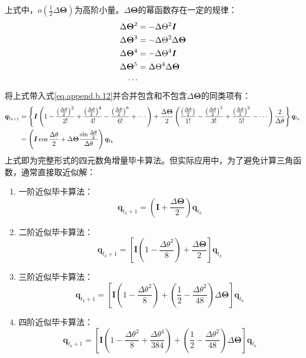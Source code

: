上式中，$o\left(\frac{1}{2}\Delta\bm{\Theta}\right)$为高阶小量。$\Delta\bm{\Theta}$的幂函数存在一定的规律：
\begin{equation}
\centering
\begin{aligned}
\Delta\bm{\Theta}^2&=-\Delta\Theta^2\bm{I}\\
\Delta\bm{\Theta}^3&=-\Delta\Theta^2\Delta\bm{\Theta}\\
\Delta\bm{\Theta}^4&=-\Delta\Theta^4\bm{I}\\
\Delta\bm{\Theta}^5&=\Delta\Theta^4\Delta\bm{\Theta}\\
\cdots
\end{aligned}
\end{equation}
将上式带入式\ref{eq.append.b.12}并合并包含和不包含$\Delta\bm{\Theta}$的同类项有：
\begin{equation}
\centering
\begin{aligned}
\bm{q}_{t_{k+1}}&=\left\{\bm{I}\left(1-\frac{\left(\frac{\Delta\theta}{2}\right)^2}{2!}+\frac{\left(\frac{\Delta\theta}{2}\right)^4}{4!}-\frac{\left(\frac{\Delta\theta}{2}\right)^6}{6!}+\cdots\right)+\frac{\Delta\bm{\Theta}}{2}\left(\frac{\left(\frac{\Delta\theta}{2}\right)}{1!}-\frac{\left(\frac{\Delta\theta}{2}\right)^3}{3!}+\frac{\left(\frac{\Delta\theta}{2}\right)^5}{5!}-\cdots\right)\frac{2}{\Delta\theta}\right\}\bm{q}_{t_k}\\
&=\left(\bm{I}\cos\frac{\Delta\theta}{2}+\Delta\bm{\Theta}\frac{\sin\frac{\Delta\theta}{2}}{\Delta\theta}\right)\bm{q}_{t_k}
\end{aligned}
\end{equation}
上式即为完整形式的四元数角增量毕卡算法。但实际应用中，为了避免计算三角函数，通常直接取近似解：
\begin{enumerate}
	\item 一阶近似毕卡算法：
	\begin{equation}
		\bm{q}_{t_k+1}=\left(\bm{I}+\frac{\Delta\bm{\Theta}}{2}\right)\bm{q}_{t_k}
	\end{equation}
	\item 二阶近似毕卡算法：
	\begin{equation}
	\bm{q}_{t_k+1}=\left[\bm{I}\left(1-\frac{\Delta\theta^2}{8}\right)+\frac{\Delta\bm{\Theta}}{2}\right]\bm{q}_{t_k}
	\end{equation}	
	\item 三阶近似毕卡算法：
	\begin{equation}
	\bm{q}_{t_k+1}=\left[\bm{I}\left(1-\frac{\Delta\theta^2}{8}\right)+\left(\frac{1}{2}-\frac{\Delta\theta^2}{48}\right)\Delta\bm{\Theta}\right]\bm{q}_{t_k}
	\end{equation}
	\item 四阶近似毕卡算法：
	\begin{equation}
	\bm{q}_{t_k+1}=\left[\bm{I}\left(1-\frac{\Delta\theta^2}{8}+\frac{\Delta\theta^4}{384}\right)+\left(\frac{1}{2}-\frac{\Delta\theta^2}{48}\right)\Delta\bm{\Theta}\right]\bm{q}_{t_k}
	\end{equation}
\end{enumerate}
